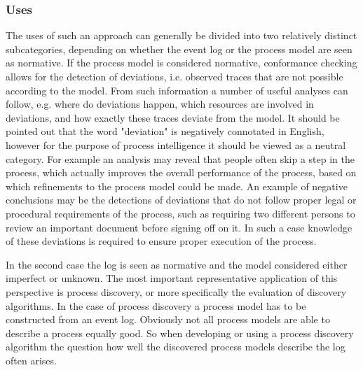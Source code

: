 \documentclass[runningheads]{template/llncs}
\begin{document}
\subsubsection{Uses}
The uses of such an approach can generally be divided into two relatively distinct subcategories, depending on whether the event log or the process model are seen as normative.
If the process model is considered normative, conformance checking allows for the detection of deviations, i.e. observed traces that are not possible according to the model.
From such information a number of useful analyses can follow, e.g. where do deviations happen, which resources are involved in deviations, and how exactly these traces deviate from the model.
It should be pointed out that the word "deviation" is negatively connotated in English, however for the purpose of process intelligence it should be viewed as a neutral category. 
For example an analysis may reveal that people often skip a step in the process, which actually improves the overall performance of the process, based on which refinements to the process model could be made.
An example of negative conclusions may be the detections of deviations that do not follow proper legal or procedural requirements of the process, such as requiring two different persons to review an important document before signing off on it. In such a case knowledge of these deviations is required to ensure proper execution of the process.

In the second case the log is seen as normative and the model considered either imperfect or unknown.
The most important representative application of this perspective is process discovery, or more specifically the evaluation of discovery algorithms.
In the case of process discovery a process model has to be constructed from an event log.
Obviously not all process models are able to describe a process equally good.
So when developing or using a process discovery algorithm the question how well the discovered process models describe the log often arises.
\end{document}
